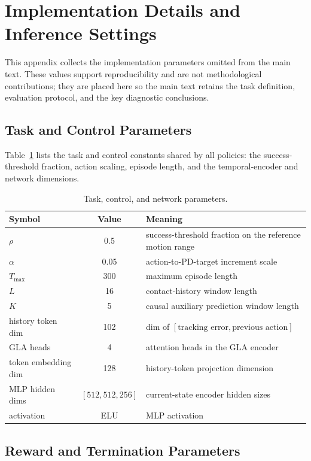 \section{Implementation Details and Inference Settings}
\label{app:impl}

This appendix collects the implementation parameters omitted from
the main text. These values support reproducibility and are not
methodological contributions; they are placed here so the main text
retains the task definition, evaluation protocol, and the key
diagnostic conclusions.


\subsection{Task and Control Parameters}
\label{app:taskhp}

Table~\ref{tab:taskhp} lists the task and control constants shared by
all policies: the success-threshold fraction, action scaling, episode
length, and the temporal-encoder and network dimensions.

\begin{table}[ht]
\centering
\caption{Task, control, and network parameters.}
\label{tab:taskhp}
\small
\begin{tabular}{lcl}
\toprule
Symbol & Value & Meaning \\
\midrule
$\rho$ & 0.5 & success-threshold fraction on the reference motion range \\
$\alpha$ & 0.05 & action-to-PD-target increment scale \\
$T_{\max}$ & 300 & maximum episode length \\
$L$ & 16 & contact-history window length \\
$K$ & 5 & causal auxiliary prediction window length \\
history token dim & 102 & dim of $[\text{tracking error}, \text{previous action}]$ \\
GLA heads & 4 & attention heads in the GLA encoder \\
token embedding dim & 128 & history-token projection dimension \\
MLP hidden dims & $[512,512,256]$ & current-state encoder hidden sizes \\
activation & ELU & MLP activation \\
\bottomrule
\end{tabular}
\end{table}


\subsection{Reward and Termination Parameters}
\label{app:rewhp}

